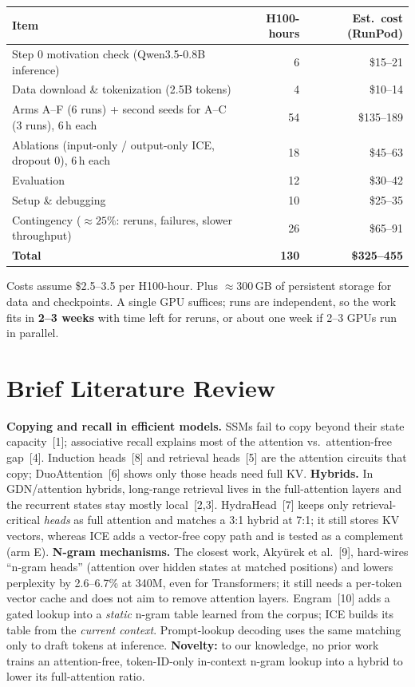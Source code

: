 \documentclass[10pt]{article}
\begin{document}
\begin{center}\small
\begin{tabular}{@{}lrr@{}}
\toprule
Item & H100-hours & Est.\ cost (RunPod) \\
\midrule
Step 0 motivation check (Qwen3.5-0.8B inference) & 6 & \$15--21 \\
Data download \& tokenization (2.5B tokens) & 4 & \$10--14 \\
Arms A--F (6 runs) + second seeds for A--C (3 runs), 6\,h each & 54 & \$135--189 \\
Ablations (input-only / output-only ICE, dropout 0), 6\,h each & 18 & \$45--63 \\
Evaluation & 12 & \$30--42 \\
Setup \& debugging & 10 & \$25--35 \\
Contingency (${\approx}25\%$: reruns, failures, slower throughput) & 26 & \$65--91 \\
\midrule
\textbf{Total} & \textbf{130} & \textbf{\$325--455} \\
\bottomrule
\end{tabular}
\end{center}
Costs assume \$2.5--3.5 per H100-hour. Plus ${\approx}300$\,GB of persistent storage for data and checkpoints. A single GPU suffices; runs are independent, so the work fits in \textbf{2--3 weeks} with time left for reruns, or about one week if 2--3 GPUs run in parallel.

\section{Brief Literature Review}

\textbf{Copying and recall in efficient models.} SSMs fail to copy beyond their state capacity~[1]; associative recall explains most of the attention vs.\ attention-free gap~[4]. Induction heads~[8] and retrieval heads~[5] are the attention circuits that copy; DuoAttention~[6] shows only those heads need full KV.
\textbf{Hybrids.} In GDN/attention hybrids, long-range retrieval lives in the full-attention layers and the recurrent states stay mostly local~[2,3]. HydraHead~[7] keeps only retrieval-critical \emph{heads} as full attention and matches a 3:1 hybrid at 7:1; it still stores KV vectors, whereas ICE adds a vector-free copy path and is tested as a complement (arm E).
\textbf{N-gram mechanisms.} The closest work, Akyürek et al.~[9], hard-wires ``n-gram heads'' (attention over hidden states at matched positions) and lowers perplexity by 2.6--6.7\% at 340M, even for Transformers; it still needs a per-token vector cache and does not aim to remove attention layers. Engram~[10] adds a gated lookup into a \emph{static} n-gram table learned from the corpus; ICE builds its table from the \emph{current context}. Prompt-lookup decoding uses the same matching only to draft tokens at inference. \textbf{Novelty:} to our knowledge, no prior work trains an attention-free, token-ID-only in-context n-gram lookup into a hybrid to lower its full-attention ratio.
\end{document}
